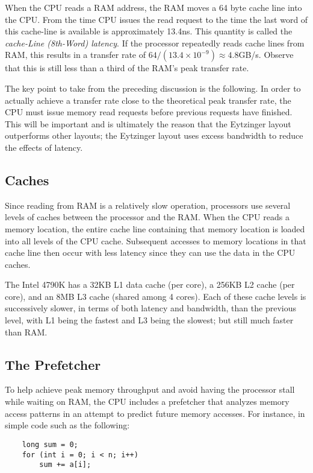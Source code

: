 \documentclass{patmorin}
\begin{document}
When the CPU reads a RAM address, the RAM moves a 64 byte cache line
into the CPU. From the time CPU issues the read request to the time
the last word of this cache-line is available is approximately 13.4ns.
This quantity is called the \emph{cache-Line (8th-Word) latency}.
If the processor repeatedly reads cache lines from RAM, this results in a
transfer rate of $64 / (13.4\times10^{-9}) \approx 4.8$GB/s.  Observe that
this is still less than a third of the RAM's peak transfer rate.

The key point to take from the preceding discussion is the following. In
order to actually achieve a transfer rate close to the theoretical peak
transfer rate, the CPU must issue memory read requests before previous
requests have finished.  This will be important and is ultimately the
reason that the Eytzinger layout outperforms other layouts; the Eytzinger
layout uses excess bandwidth to reduce the effects of latency.

\subsection{Caches}

Since reading from RAM is a relatively slow operation, processors use
several levels of caches between the processor and the RAM.  When the
CPU reads a memory location, the entire cache line containing that memory
location is loaded into all levels of the CPU cache.  Subsequent accesses
to memory locations in that cache line then occur with less latency
since they can use the data in the CPU caches.

The Intel 4790K has a 32KB L1 data cache (per core), a 256KB L2 cache (per
core), and an 8MB L3 cache (shared among 4 cores).  Each of these cache
levels is successively slower, in terms of both latency and bandwidth,
than the previous level, with L1 being the fastest and L3 being the slowest;
but still much faster than RAM.

\subsection{The Prefetcher}

To help achieve peak memory throughput and avoid having the processor
stall while waiting on RAM, the CPU includes a prefetcher that analyzes
memory access patterns in an attempt to predict future memory accesses.
For instance, in simple code such as the following:

\begin{verbatim}
    long sum = 0;
    for (int i = 0; i < n; i++) 
        sum += a[i];
\end{verbatim}
\end{document}
